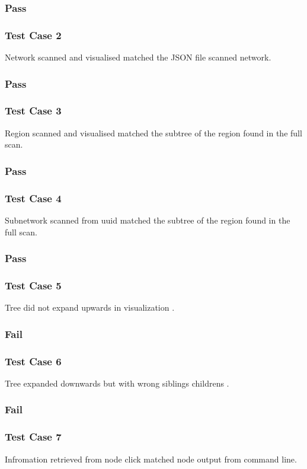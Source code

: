 \documentclass[hidelinks,a4paper,12pt]{article}
\begin{document}
\subsubsection{Pass}
\subsubsection{Test Case 2}
Network scanned and visualised matched the JSON file scanned network.
\subsubsection{Pass}
\subsubsection{Test Case 3}
Region scanned and visualised matched the subtree of the region found in the full scan.
\subsubsection{Pass}
\subsubsection{Test Case 4}
Subnetwork scanned from uuid matched the subtree of the region found in the full scan.
\subsubsection{Pass}
\subsubsection{Test Case 5}
Tree did not expand upwards in visualization .
\subsubsection{Fail}
\subsubsection{Test Case 6}
Tree expanded downwards but with wrong siblings childrens .
\subsubsection{Fail}
\subsubsection{Test Case 7}
Infromation retrieved from node click matched node output from command line.
\end{document}
